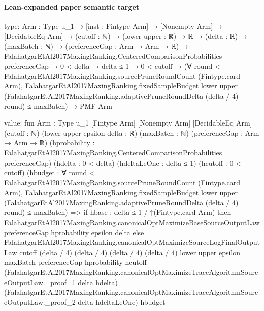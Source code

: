 \documentclass[10pt]{article}
\begin{document}
\paragraph{Lean-expanded paper semantic target}
\begin{ReviewVerbatim}
type:
{Arm : Type u_1} →
  [inst : Fintype Arm] →
    [Nonempty Arm] →
      [DecidableEq Arm] →
        (cutoff : ℕ) →
          (lower upper : ℝ) →
            ℝ →
              (delta : ℝ) →
                (maxBatch : ℕ) →
                  (preferenceGap : Arm → Arm → ℝ) →
                    FalahatgarEtAl2017MaxingRanking.CenteredComparisonProbabilities preferenceGap →
                      0 < delta →
                        delta ≤ 1 →
                          0 < cutoff →
                            (∀ round < FalahatgarEtAl2017MaxingRanking.sourcePruneRoundCount (Fintype.card Arm),
                                FalahatgarEtAl2017MaxingRanking.fixedSampleBudget lower upper
                                    (FalahatgarEtAl2017MaxingRanking.adaptivePruneRoundDelta (delta / 4) round) ≤
                                  maxBatch) →
                              PMF Arm

value:
fun {Arm : Type u_1} [Fintype Arm] [Nonempty Arm] [DecidableEq Arm] (cutoff : ℕ) (lower upper epsilon delta : ℝ)
    (maxBatch : ℕ) (preferenceGap : Arm → Arm → ℝ)
    (hprobability : FalahatgarEtAl2017MaxingRanking.CenteredComparisonProbabilities preferenceGap) (hdelta : 0 < delta)
    (hdeltaLeOne : delta ≤ 1) (hcutoff : 0 < cutoff)
    (hbudget :
      ∀ round < FalahatgarEtAl2017MaxingRanking.sourcePruneRoundCount (Fintype.card Arm),
        FalahatgarEtAl2017MaxingRanking.fixedSampleBudget lower upper
            (FalahatgarEtAl2017MaxingRanking.adaptivePruneRoundDelta (delta / 4) round) ≤
          maxBatch) =>
  if hbase : delta ≤ 1 / ↑(Fintype.card Arm) then
    FalahatgarEtAl2017MaxingRanking.canonicalOptMaximizeBaseSourceOutputLaw preferenceGap hprobability epsilon delta
  else
    FalahatgarEtAl2017MaxingRanking.canonicalOptMaximizeSourceLogFinalOutputLaw cutoff (delta / 4) (delta / 4)
      (delta / 4) (delta / 4) lower upper epsilon maxBatch preferenceGap hprobability hcutoff
      (FalahatgarEtAl2017MaxingRanking.canonicalOptMaximizeTraceAlgorithmSourceOutputLaw._proof_1 delta hdelta)
      (FalahatgarEtAl2017MaxingRanking.canonicalOptMaximizeTraceAlgorithmSourceOutputLaw._proof_2 delta hdeltaLeOne)
      hbudget
\end{ReviewVerbatim}
\end{document}
